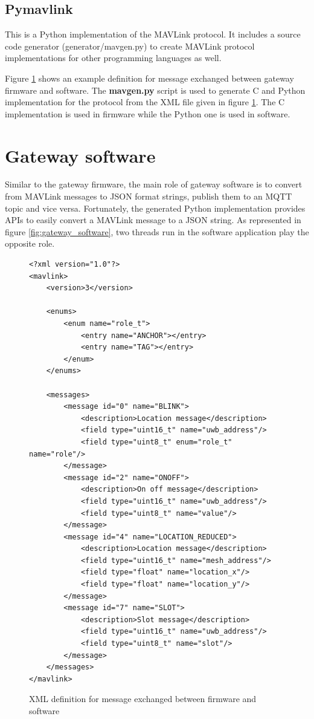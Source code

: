 \documentclass[\main/main.tex]{subfiles}
\begin{document}
\subsection{Pymavlink}

This is a Python implementation of the MAVLink protocol. It includes a source code generator (generator/mavgen.py) to create MAVLink protocol implementations for other programming languages as well. 

Figure \ref{net_mesh_mavlink_protocol} shows an example definition for message exchanged between gateway firmware and software. The \textbf{mavgen.py} script is used to generate C and Python implementation for the protocol from the XML file given in figure \ref{net_mesh_mavlink_protocol}. The C implementation is used in firmware while the Python one is used in software.

\section{Gateway software}
Similar to the gateway firmware, the main role of gateway software is to convert from MAVLink messages to JSON format strings, publish them to an MQTT topic and vice versa. Fortunately, the generated Python implementation provides APIs to easily convert a MAVLink message to a JSON string. As represented in figure \ref{fig:gateway_software}, two threads run in the software application play the opposite role. 

\begin{figure}[H]
    \begin{lstlisting}[style=XMLStyle, emph={messages, message, enums, enum, mavlink}]
<?xml version="1.0"?>
<mavlink>
    <version>3</version>

    <enums>
        <enum name="role_t">
            <entry name="ANCHOR"></entry>
            <entry name="TAG"></entry>
        </enum>
    </enums>

    <messages>
        <message id="0" name="BLINK">
            <description>Location message</description>
            <field type="uint16_t" name="uwb_address"/>
            <field type="uint8_t" enum="role_t" name="role"/>
        </message>
        <message id="2" name="ONOFF">
            <description>On off message</description>
            <field type="uint16_t" name="uwb_address"/>
            <field type="uint8_t" name="value"/>
        </message>
        <message id="4" name="LOCATION_REDUCED">
            <description>Location message</description>
            <field type="uint16_t" name="mesh_address"/>
            <field type="float" name="location_x"/>
            <field type="float" name="location_y"/>
        </message>
        <message id="7" name="SLOT">
            <description>Slot message</description>
            <field type="uint16_t" name="uwb_address"/>
            <field type="uint8_t" name="slot"/>
        </message>
    </messages>
</mavlink>
    \end{lstlisting}
    \caption{XML definition for message exchanged between firmware and software}
    \label{net_mesh_mavlink_protocol}
\end{figure}
\end{document}
